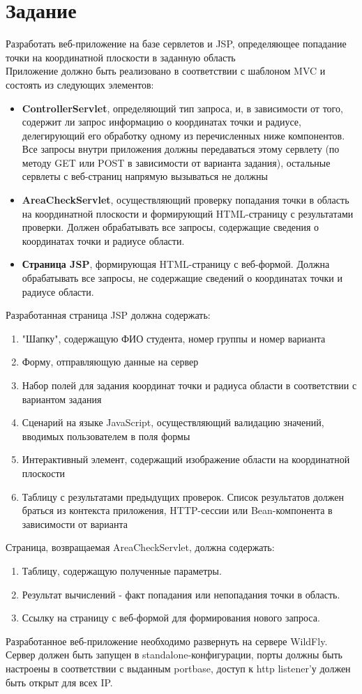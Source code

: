 \documentclass[12pt,a4paper]{report}
\begin{document}
\section*{Задание}
Разработать веб-приложение на базе сервлетов и JSP, определяющее попадание точки на координатной плоскости в заданную область \\
\hfill\break
Приложение должно быть реализовано в соответствии с шаблоном MVC и состоять из следующих элементов:
\begin{itemize}
    \item \textbf{ControllerServlet}, определяющий тип запроса, и, в зависимости от того, содержит ли запрос информацию о координатах точки и радиусе, делегирующий его обработку одному из перечисленных ниже компонентов. Все запросы внутри приложения должны передаваться этому сервлету (по методу GET или POST в зависимости от варианта задания), остальные сервлеты с веб-страниц напрямую вызываться не должны
    \item \textbf{AreaCheckServlet}, осуществляющий проверку попадания точки в область на координатной плоскости и формирующий HTML-страницу с результатами проверки. Должен обрабатывать все запросы, содержащие сведения о координатах точки и радиусе области.
    \item \textbf{Страница JSP}, формирующая HTML-страницу с веб-формой. Должна обрабатывать все запросы, не содержащие сведений о координатах точки и радиусе области.
\end{itemize}
Разработанная страница JSP должна содержать:
\begin{enumerate}
    \item "Шапку", содержащую ФИО студента, номер группы и номер варианта
    \item Форму, отправляющую данные на сервер
    \item Набор полей для задания координат точки и радиуса области в соответствии с вариантом задания
    \item Сценарий на языке JavaScript, осуществляющий валидацию значений, вводимых пользователем в поля формы
    \item Интерактивный элемент, содержащий изображение области на координатной плоскости
    \item Таблицу с результатами предыдущих проверок. Список результатов должен браться из контекста приложения, HTTP-сессии или Bean-компонента в зависимости от варианта
\end{enumerate}
Страница, возвращаемая AreaCheckServlet, должна содержать:
\begin{enumerate}
    \item Таблицу, содержащую полученные параметры.
    \item Результат вычислений - факт попадания или непопадания точки в область.
    \item Ссылку на страницу с веб-формой для формирования нового запроса.
\end{enumerate}
Разработанное веб-приложение необходимо развернуть на сервере WildFly. Сервер должен быть запущен в standalone-конфигурации, порты должны быть настроены в соответствии с выданным portbase, доступ к http listener'у должен быть открыт для всех IP.
\end{document}
